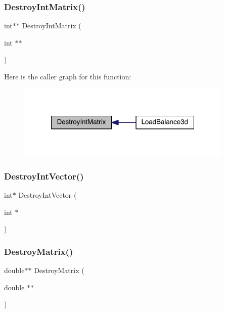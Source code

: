 \mbox{\label{a00554_a4212ac496c2e42e38dd0ad0cd18ed161}} 
\subsubsection{\texorpdfstring{Destroy\+Int\+Matrix()}{DestroyIntMatrix()}}
{\footnotesize\ttfamily int$\ast$$\ast$ Destroy\+Int\+Matrix (\begin{DoxyParamCaption}\item[{int $\ast$$\ast$}]{ }\end{DoxyParamCaption})}

Here is the caller graph for this function\+:\nopagebreak
\begin{figure}[H]
\begin{center}
\leavevmode
\includegraphics[width=292pt]{a00554_a4212ac496c2e42e38dd0ad0cd18ed161_icgraph}
\end{center}
\end{figure}
\mbox{\label{a00554_ab7be757b254a2ca937d1d5399cbc63af}} 
\subsubsection{\texorpdfstring{Destroy\+Int\+Vector()}{DestroyIntVector()}}
{\footnotesize\ttfamily int$\ast$ Destroy\+Int\+Vector (\begin{DoxyParamCaption}\item[{int $\ast$}]{ }\end{DoxyParamCaption})}

\mbox{\label{a00554_afa534e284e3bdd83ec70e03b3348d960}} 
\subsubsection{\texorpdfstring{Destroy\+Matrix()}{DestroyMatrix()}}
{\footnotesize\ttfamily double$\ast$$\ast$ Destroy\+Matrix (\begin{DoxyParamCaption}\item[{double $\ast$$\ast$}]{ }\end{DoxyParamCaption})}

